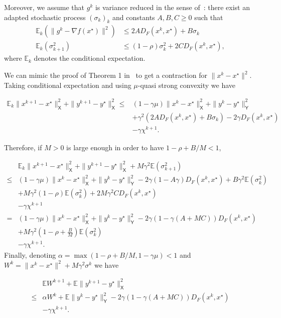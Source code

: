 \documentclass{article}
\newcommand{\asnote}[1]{\todo[color=green!]{#1}}
\newcommand{\bE}{{\mathbb E}}
\newcommand{\sX}{{\mathsf X}}
\newcommand{\sY}{{\mathsf Y}}
\theoremstyle{definition}
\begin{document}
Moreover, we assume that $g^k$ is variance reduced in the sense of~\cite{gorbunov2019unified}: there exist an adapted stochastic process $(\sigma_k)_k$ and constants $A,B,C \geq 0$ such that
\begin{align}
    \bE_k(\|g^k - \nabla f(x^\star)\|^2) &\leq 2AD_F(x^k,x^\star) + B\sigma_k\\
    \bE_k(\sigma_{k+1}^2) &\leq (1-\rho)\sigma_k^2 + 2CD_F(x^k,x^\star),
\end{align}
where $\bE_k$ denotes the conditional expectation.


We can mimic the proof of Theorem 1 in~\cite{gorbunov2019unified} to get a contraction for $\|x^k-x^\star\|^2$.
Taking conditional expectation and using $\mu$-quasi strong convexity we have

\begin{align*}
    \bE_k \|x^{k+1} - x^\star\|_\sX^2 + \|y^{k+1} - y^\star\|_\sX^2 
    \leq& (1-\gamma\mu)\|x^k - x^\star\|_\sX^2 + \|y^k - y^\star\|_\sY^2 \\
    &+ \gamma^2 (2AD_F(x^k,x^\star) + B\sigma_k) - 2\gamma D_F(x^k,x^\star)\\
    &-\gamma\chi^{k+1}.
\end{align*}

Therefore, if $M>0$ is large enough in order to have $1-\rho+B/M < 1$,

\begin{align*}
    &\bE_k \|x^{k+1} - x^\star\|_\sX^2 + \|y^{k+1} - y^\star\|_\sX^2 + M\gamma^2\bE(\sigma_{k+1}^2)\\
    \leq& (1-\gamma\mu)\|x^k - x^\star\|_\sX^2 + \|y^k - y^\star\|_\sY^2 -2\gamma(1-A\gamma)D_F(x^k,x^\star) + B\gamma^2\bE(\sigma_k^2)\\
     &+ M\gamma^2(1-\rho)\bE(\sigma_k^2)+ 2M\gamma^2CD_F(x^k,x^\star)\\
    &-\gamma\chi^{k+1}\\
    =& (1-\gamma\mu)\|x^k - x^\star\|_\sX^2 + \|y^k - y^\star\|_\sY^2 -2\gamma(1-\gamma(A+MC))D_F(x^k,x^\star)\\
     &+ M\gamma^2(1-\rho+\frac{B}{M})\bE(\sigma_k^2)\\
    &-\gamma\chi^{k+1}.
\end{align*}
Finally, denoting $\alpha = \max(1-\rho+B/M,1-\gamma\mu) < 1$ and $W^k = \|x^k-x^\star\|^2 + M\gamma^2\sigma^k$ we have

\asnote{Weakly convex case?}

\begin{align*}
    &\bE W^{k+1} + \bE \|y^{k+1} - y^\star\|_\sX^2\\
    \leq& \alpha W^k + \bE\|y^k - y^\star\|_\sY^2 -2\gamma(1-\gamma(A+MC))D_F(x^k,x^\star)\\
     &-\gamma\chi^{k+1}.
\end{align*}
\end{document}
